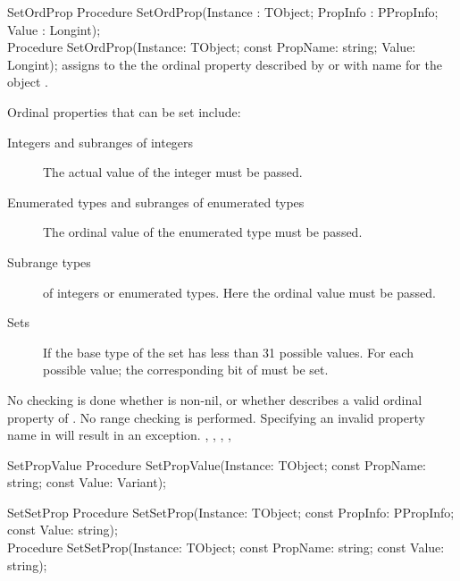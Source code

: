 \begin{procedure}{SetOrdProp}
\Declaration
Procedure SetOrdProp(Instance : TObject; PropInfo : PPropInfo; 
                     Value : Longint);\\
Procedure SetOrdProp(Instance: TObject; const PropName: string;
                     Value: Longint);
\Description
{} assigns  to the the ordinal property described by 
 or with name  for the object . 

Ordinal properties that can be set include:
\begin{description}
\item[Integers and subranges of integers] The actual value of the integer must be 
passed.
\item[Enumerated types and subranges of enumerated types] The ordinal value
of the enumerated type must be passed.
\item[Subrange types] of integers or enumerated types. Here the ordinal
value must be passed.
\item[Sets] If the base type of the set has less than 31 possible values.
For each possible value; the corresponding bit of  must be set.
\end{description}
\Errors
No checking is done whether  is non-nil, or whether
 describes a valid ordinal property of . 
No range checking is performed.
Specifying an invalid property name in  will result in an
 exception.
\SeeAlso
{}, , ,
,
\end{procedure}

\begin{procedure}{SetPropValue}
\Declaration
Procedure SetPropValue(Instance: TObject; 
                       const PropName: string; const Value: Variant);                   
\Description
\Errors
\SeeAlso
\end{procedure}

\begin{procedure}{SetSetProp}
\Declaration
Procedure SetSetProp(Instance: TObject; 
                     const PropInfo: PPropInfo; const Value: string);\\
Procedure SetSetProp(Instance: TObject;
                     const PropName: string; const Value: string);                      
\Description
\Errors
\SeeAlso
\end{procedure}

